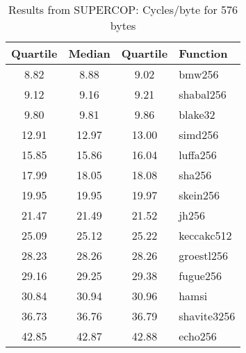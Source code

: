 \begin{table}
  \centering
  \begin{tabular}{ | c | c | c | l | }
    \hline
    \textbf{Quartile} & \textbf{Median} & \textbf{Quartile} & \textbf{Function} \\ \hline
    8.82 & 8.88 & 9.02 & bmw256 \\ \hline
    9.12 & 9.16 & 9.21 & shabal256 \\ \hline
    9.80 & 9.81 & 9.86 & blake32 \\ \hline
    12.91 & 12.97 & 13.00 & simd256 \\ \hline
    15.85 & 15.86 & 16.04 & luffa256 \\ \hline
    17.99 & 18.05 & 18.08 & sha256 \\ \hline
    19.95 & 19.95 & 19.97 & skein256 \\ \hline
    21.47 & 21.49 & 21.52 & jh256 \\ \hline
    25.09 & 25.12 & 25.22 & keccakc512 \\ \hline
    28.23 & 28.26 & 28.26 & groestl256 \\ \hline
    29.16 & 29.25 & 29.38 & fugue256 \\ \hline
    30.84 & 30.94 & 30.96 & hamsi \\ \hline
    36.73 & 36.76 & 36.79 & shavite3256 \\ \hline
    42.85 & 42.87 & 42.88 & echo256 \\ \hline
  \end{tabular}
  \caption{Results from SUPERCOP: Cycles/byte for 576 bytes}
  \label{tbl:supercop:576}
\end{table}
